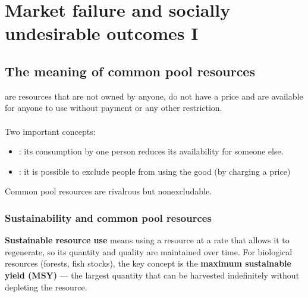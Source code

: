 \section{Market failure and socially undesirable outcomes I}
\subsection{The meaning of common pool resources}
 are resources that are not owned by anyone, do not have a price and are available for anyone to use without payment or any other restriction.\\\\
Two important concepts:
\begin{itemize}
  \item {}: its consumption by one person reduces its availability for someone else.
  \item {}: it is possible to exclude people from using the good (by charging a price)
\end{itemize}
Common pool resources are rivalrous but non­excludable. 
\subsubsection*{Sustainability and common pool resources}
\textbf{Sustainable resource use} means using a resource at a rate that allows it to regenerate, so its quantity and quality are maintained over time. For biological resources (forests, fish stocks), the key concept is the \textbf{maximum sustainable yield (MSY)} --- the largest quantity that can be harvested indefinitely without depleting the resource.

